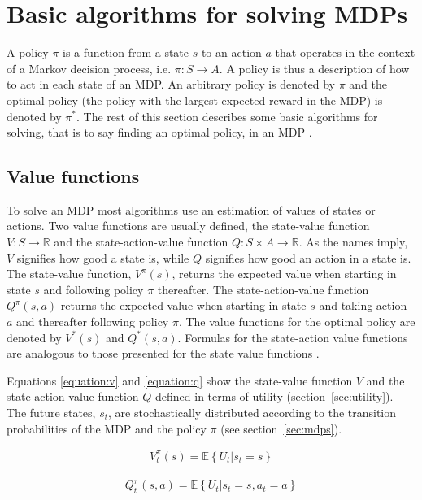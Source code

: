 \section{Basic algorithms for solving MDPs}

A policy $\pi$ is a function from a state $s$ to an action $a$ that operates in
the context of a Markov decision process, i.e. $\pi \colon S \to A$. A policy
is thus a description of how to act in each state of an MDP. An arbitrary
policy is denoted by $\pi$ and the optimal policy (the policy with the largest
expected reward in the MDP) is denoted by $\pi^*$. The rest of this section
describes some basic algorithms for solving, that is to say finding an optimal
policy, in an MDP \parencite{barto1998reinforcement}.

\subsection{Value functions}

To solve an MDP most algorithms use an estimation of values of states or
actions. Two value functions are usually defined, the state-value function $V :
S \to \mathbb R$ and the state-action-value function $Q : S \times A \to
\mathbb R$. As the names imply, $V$ signifies how good a state is, while $Q$
signifies how good an action in a state is. The state-value function,
$V^\pi(s)$, returns the expected value when starting in state $s$ and following
policy $\pi$ thereafter. The state-action-value function $Q^\pi(s, a)$ returns
the expected value when starting in state $s$ and taking action $a$ and
thereafter following policy $\pi$. The value functions for the optimal policy
are denoted by $V^*(s)$ and $Q^*(s, a)$. Formulas for the state-action value
functions are analogous to those presented for the state value functions
\parencite{barto1998reinforcement}. 

Equations \eqref{equation:v} and \eqref{equation:q} show the state-value
function $V$ and the state-action-value function $Q$ defined in terms of
utility (section~\ref{sec:utility}). The future states, $s_t$, are
stochastically distributed according to the transition probabilities of the MDP
and the policy $\pi$ (see section~\ref{sec:mdps}).

\begin{align}
\label{equation:v}
V_t^\pi(s) = \mathbb{E} \left\{
  \left. U_t
  \right\vert s_t = s
\right\}
\end{align}

\begin{align}
\label{equation:q}
Q_t^\pi(s, a) = \mathbb{E} \left\{
  \left. U_t
  \right\vert s_t = s, a_t = a
\right\}
\end{align}

